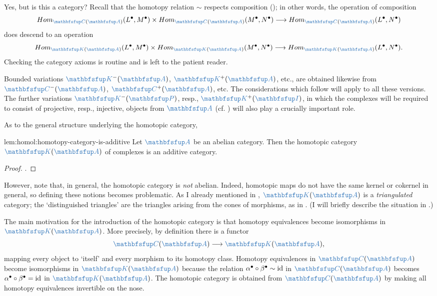 Yes, but is this a category? Recall that the homotopy relation $\sim$
respects composition
(); in other
words, the operation of composition
\[
  \Hom_{\categ{C}(\categ{A})}(L^\bullet, M^\bullet) \times
  \Hom_{\categ{C}(\categ{A})}(M^\bullet, N^\bullet) \longrightarrow
  \Hom_{\categ{C}(\categ{A})}(L^\bullet, N^\bullet)
\]
does descend to an operation
\[
  \Hom_{\categ{K}(\categ{A})}(L^\bullet, M^\bullet) \times
  \Hom_{\categ{K}(\categ{A})}(M^\bullet, N^\bullet) \longrightarrow
  \Hom_{\categ{K}(\categ{A})}(L^\bullet, N^\bullet).
\]
Checking the category axioms is routine and is left to the patient
reader.

Bounded variations $\categ{K}^-(\categ{A})$, $\categ{K}^+(\categ{A})$,
etc., are obtained likewise from $\categ{C}^-(\categ{A})$,
$\categ{C}^+(\categ{A})$, etc. The considerations which follow will
apply to all these versions. The further variations
$\categ{K}^-(\categ{P})$, resp., $\categ{K}^+(\categ{I})$, in which
the complexes will be required to consist of projective, resp.,
injective, objects from $\categ{A}$
(cf. )
will also play a crucially important role.

As to the general structure underlying the homotopic category,

\begin{lem}{}{lem:homol:homotopy-category-is-additive}
  Let $\categ{A}$ be an abelian category. Then the homotopic category
  $\categ{K}(\categ{A})$ of complexes is an additive category.
\end{lem}
\begin{proof}
  .
\end{proof}

However, note that, in general, the homotopic category is \emph{not}
abelian. Indeed, homotopic maps do not have the same kernel or
cokernel in general, so defining these notions becomes problematic.
As I already mentioned in ,
$\categ{K}(\categ{A})$ is a \emph{triangulated} category; the
`distinguished triangles' are the triangles arising from the cones of
morphisms, as in
. (I will briefly
describe the situation in
.)

The main motivation for the introduction of the homotopic category is
that homotopy equivalences become isomorphisms in
$\categ{K}(\categ{A})$. More precisely, by definition there is a
functor
\[
  \categ{C}(\categ{A}) \longrightarrow \categ{K}(\categ{A}),
\]
mapping every object to `itself' and every morphism to its homotopy
class. Homotopy equivalences in $\categ{C}(\categ{A})$ become
isomorphisms in $\categ{K}(\categ{A})$ because the relation
$\alpha^\bullet \circ \beta^\bullet \sim \operatorname{id}$ in
$\categ{C}(\categ{A})$ becomes
$\alpha^\bullet \circ \beta^\bullet = \operatorname{id}$ in
$\categ{K}(\categ{A})$. The homotopic category is obtained from
$\categ{C}(\categ{A})$ by making all homotopy equivalences invertible
on the nose.

